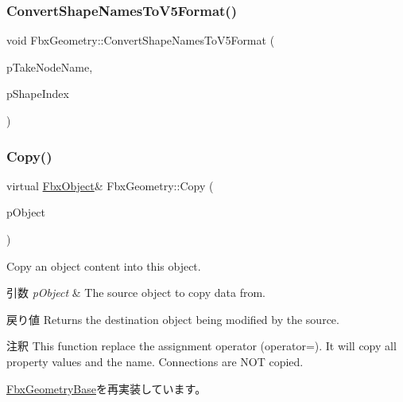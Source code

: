 \subsubsection{\texorpdfstring{Convert\+Shape\+Names\+To\+V5\+Format()}{ConvertShapeNamesToV5Format()}\hspace{0.1cm}{\footnotesize\ttfamily [2/2]}}
{\footnotesize\ttfamily void Fbx\+Geometry\+::\+Convert\+Shape\+Names\+To\+V5\+Format (\begin{DoxyParamCaption}\item[{\hyperlink{class_fbx_string}{Fbx\+String}}]{p\+Take\+Node\+Name,  }\item[{int}]{p\+Shape\+Index }\end{DoxyParamCaption})}

\mbox{\label{class_fbx_geometry_aac1cee4251e3d5fbd27f1181c58b83b3}} 
\subsubsection{\texorpdfstring{Copy()}{Copy()}}
{\footnotesize\ttfamily virtual \hyperlink{class_fbx_object}{Fbx\+Object}\& Fbx\+Geometry\+::\+Copy (\begin{DoxyParamCaption}\item[{const \hyperlink{class_fbx_object}{Fbx\+Object} \&}]{p\+Object }\end{DoxyParamCaption})\hspace{0.3cm}{\ttfamily [virtual]}}

Copy an object content into this object. 
\begin{DoxyParams}{引数}
{\em p\+Object} & The source object to copy data from. \\
\hline
\end{DoxyParams}
\begin{DoxyReturn}{戻り値}
Returns the destination object being modified by the source. 
\end{DoxyReturn}
\begin{DoxyRemark}{注釈}
This function replace the assignment operator (operator=). It will copy all property values and the name. Connections are N\+OT copied. 
\end{DoxyRemark}


\hyperlink{class_fbx_geometry_base_a2c3754831338327259c35caebbf379d3}{Fbx\+Geometry\+Base}を再実装しています。




